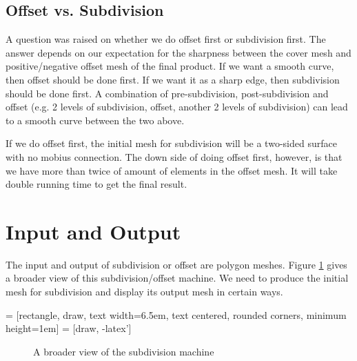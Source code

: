 \documentclass[12pt]{article}
\begin{document}
\subsection{Offset vs. Subdivision}
A question was raised on whether we do offset first or subdivision first. The answer depends on our expectation for the sharpness between the cover mesh and positive/negative offset mesh of the final product. If we want a smooth curve, then offset should be done first. If we want it as a sharp edge, then subdivision should be done first. A combination of pre-subdivision, post-subdivision and offset (e.g. 2 levels of subdivision, offset, another 2 levels of subdivision) can lead to a smooth curve between the two above.

If we do offset first, the initial mesh for subdivision will be a two-sided surface with no mobius connection. The down side of doing offset first, however, is that we have more than twice of amount of elements in the offset mesh. It will take double running time to get the final result.

\newpage
\section{Input and Output}
The input and output of subdivision or offset are polygon meshes. Figure \ref{figure:birdView} gives a broader view of this subdivision/offset machine. We need to produce the initial mesh for subdivision and display its output mesh in certain ways.

 = [rectangle, draw, 
    text width=6.5em, text centered, rounded corners, minimum height=1em]
 = [draw, -latex']

\begin{figure}[ht]
  \centering    
    \caption{A broader view of the subdivision machine}
    \label{figure:birdView}
\end{figure}
\end{document}

